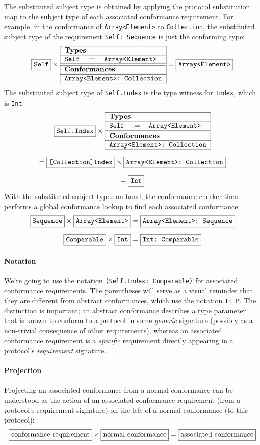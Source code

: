 \documentclass[a4paper,headsepline,bibliography=totoc,toc=flat,fleqn,twoside=semi]{scrbook}
\theoremstyle{definition}
\theoremstyle{definition}
\theoremstyle{definition}
\newcommand{\mathboxed}[1]{\boxed{\mbox{\vphantom{pI\texttt{pI}}#1}}}
\newcommand{\ttbox}[1]{\boxed{\mbox{\vphantom{pI\texttt{pI}}\texttt{#1}}}}
\newcommand{\SubMapC}[2]{\begin{tabular}{|lll|}
\hline
\multicolumn{3}{|l|}{\textbf{Types}}\\
\hline
#1\\
\hline
\hline
\multicolumn{3}{|l|}{\textbf{Conformances}}\\
\hline
#2\\
\hline
\end{tabular}}
\newcommand{\SubType}[2]{\texttt{#1}&$:=$&\texttt{#2}}
\newcommand{\SubConf}[1]{\multicolumn{3}{|l|}{\texttt{#1}}}
\begin{document}
The substituted subject type is obtained by applying the protocol substitution map to the subject type of each associated conformance requirement. For example, in the conformance of \texttt{Array<Element>} to \texttt{Collection}, the substituted subject type of the requirement \verb|Self: Sequence| is just the conforming type:
\[
\ttbox{Self} \times \SubMapC{\SubType{Self}{Array<Element>}}{\SubConf{Array<Element>:\ Collection}} = \ttbox{Array<Element>}\\[\medskipamount]
\]
The substituted subject type of \verb|Self.Index| is the type witness for \verb|Index|, which is \verb|Int|:
\begin{gather*}
\ttbox{Self.Index} \times \SubMapC{\SubType{Self}{Array<Element>}}{\SubConf{Array<Element>:\ Collection}}\\[\medskipamount]
= \ttbox{[Collection]Index} \times \ttbox{Array<Element>:\ Collection}\\[\medskipamount]
= \ttbox{Int}
\end{gather*}
With the substituted subject types on hand, the conformance checker then performs a global conformance lookup to find each associated conformance:
\begin{gather*}
\ttbox{Sequence} \times \ttbox{Array<Element>} = \ttbox{Array<Element>:\ Sequence}\\[\medskipamount]
\ttbox{Comparable} \times \ttbox{Int} = \ttbox{Int:\ Comparable}
\end{gather*}
\paragraph{Notation} We're going to use the notation \verb|(Self.Index: Comparable)| for associated conformance requirements. The parentheses will serve as a visual reminder that they are different from abstract conformances, which use the notation \verb|T: P|. The distinction is important; an abstract conformance describes a type parameter that is known to conform to a protocol in some \emph{generic} signature (possibly as a non-trivial consequence of other requirements), whereas an associated conformance requirement is a \emph{specific} requirement directly appearing in a protocol's \emph{requirement} signature. 

\paragraph{Projection}
Projecting an associated conformance from a normal conformance can be understood as the action of an associated conformance requirement (from a protocol's requirement signature) on the left of a normal conformance (to this protocol):
\[
\mathboxed{conformance requirement} \times \mathboxed{normal conformance} = \mathboxed{associated conformance}
\]
\end{document}
